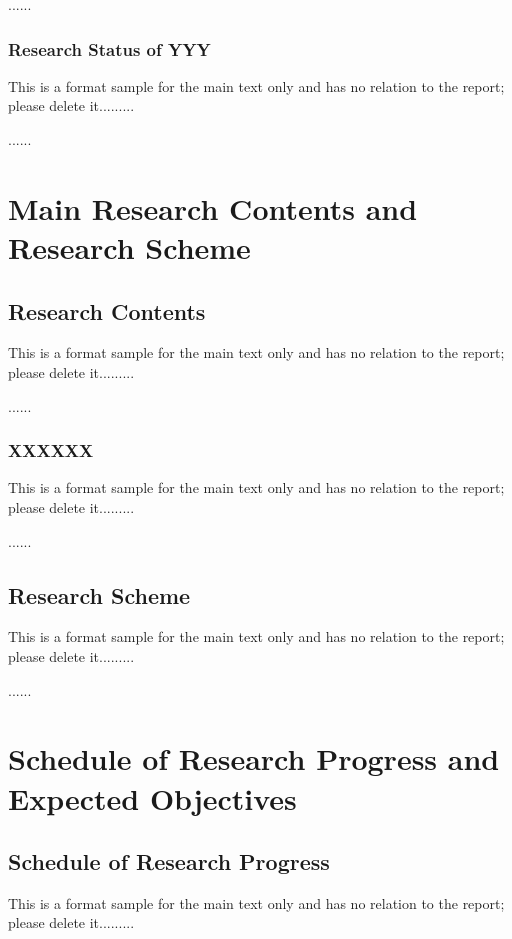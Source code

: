 ......

\subsubsection{Research Status of YYY}

This is a format sample for the main text only and has no relation to the report; please delete it.........

......

\section{Main Research Contents and Research Scheme}

\subsection{Research Contents}

This is a format sample for the main text only and has no relation to the report; please delete it.........

......

\subsubsection{XXXXXX}

This is a format sample for the main text only and has no relation to the report; please delete it.........

......

\hitenter

\subsection{Research Scheme}

This is a format sample for the main text only and has no relation to the report; please delete it.........

......

\section{Schedule of Research Progress and Expected Objectives}

\subsection{Schedule of Research Progress}

This is a format sample for the main text only and has no relation to the report; please delete it.........


